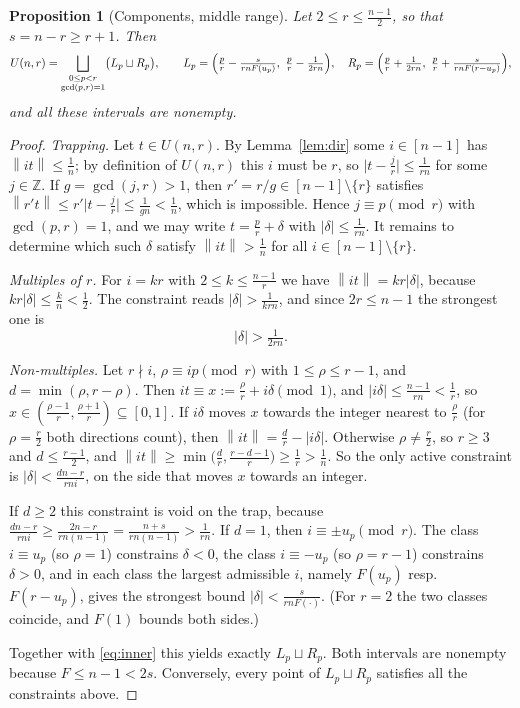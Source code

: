 \documentclass[11pt]{article}
\newtheorem{proposition}[theorem]{Proposition}
\theoremstyle{definition}
\newcommand{\Z}{\mathbb{Z}}
\newcommand{\norm}[1]{\left\lVert #1 \right\rVert}
\begin{document}
\begin{proposition}[Components, middle range]\label{prop:comp}
Let $2\le r\le\frac{n-1}2$, so that $s=n-r\ge r+1$. Then
\[
U(n,r)=\bigsqcup_{\substack{0\le p<r\\ \gcd(p,r)=1}}\bigl(L_p\sqcup R_p\bigr),
\qquad
L_p=\Bigl(\tfrac pr-\tfrac{s}{rnF(u_p)},\ \tfrac pr-\tfrac1{2rn}\Bigr),\quad
R_p=\Bigl(\tfrac pr+\tfrac1{2rn},\ \tfrac pr+\tfrac{s}{rnF(r-u_p)}\Bigr),
\]
and all these intervals are nonempty.
\end{proposition}

\begin{proof}
\emph{Trapping.} Let $t\in U(n,r)$. By Lemma~\ref{lem:dir} some
$i\in[n-1]$ has $\norm{it}\le\frac1n$; by definition of $U(n,r)$ this
$i$ must be $r$, so $\lvert t-\frac jr\rvert\le\frac1{rn}$ for some
$j\in\Z$. If $g=\gcd(j,r)>1$, then $r'=r/g\in[n-1]\setminus\{r\}$
satisfies
$\norm{r't}\le r'\lvert t-\frac jr\rvert\le\frac1{gn}<\frac1n$, which is
impossible. Hence $j\equiv p\pmod r$ with $\gcd(p,r)=1$, and we may
write $t=\frac pr+\delta$ with $\lvert\delta\rvert\le\frac1{rn}$. It
remains to determine which such $\delta$ satisfy $\norm{it}>\frac1n$
for all $i\in[n-1]\setminus\{r\}$.

\emph{Multiples of $r$.} For $i=kr$ with $2\le k\le\frac{n-1}r$ we
have $\norm{it}=kr\lvert\delta\rvert$, because
$kr\lvert\delta\rvert\le\frac kn<\frac12$. The constraint reads
$\lvert\delta\rvert>\frac1{krn}$, and since $2r\le n-1$ the strongest
one is
\begin{equation}\label{eq:inner}
\lvert\delta\rvert>\tfrac1{2rn}.
\end{equation}

\emph{Non-multiples.} Let $r\nmid i$, $\rho\equiv ip\pmod r$ with
$1\le\rho\le r-1$, and $d=\min(\rho,r-\rho)$. Then
$it\equiv x:=\frac\rho r+i\delta\pmod1$, and
$\lvert i\delta\rvert\le\frac{n-1}{rn}<\frac1r$, so
$x\in(\frac{\rho-1}r,\frac{\rho+1}r)\subseteq[0,1]$. If $i\delta$ moves
$x$ towards the integer nearest to $\frac\rho r$ (for $\rho=\frac r2$
both directions count), then $\norm{it}=\frac dr-\lvert i\delta\rvert$.
Otherwise $\rho\ne\frac r2$, so $r\ge3$ and $d\le\frac{r-1}2$, and
$\norm{it}\ge\min\bigl(\frac dr,\frac{r-d-1}r\bigr)\ge\frac1r>\frac1n$.
So the only active constraint is
$\lvert\delta\rvert<\frac{dn-r}{rni}$, on the side that moves $x$
towards an integer.

If $d\ge2$ this constraint is void on the trap, because
$\frac{dn-r}{rni}\ge\frac{2n-r}{rn(n-1)}=\frac{n+s}{rn(n-1)}>\frac1{rn}$.
If $d=1$, then $i\equiv\pm u_p\pmod r$. The class $i\equiv u_p$ (so
$\rho=1$) constrains $\delta<0$, the class $i\equiv-u_p$ (so
$\rho=r-1$) constrains $\delta>0$, and in each class the largest
admissible $i$, namely $F(u_p)$ resp.\ $F(r-u_p)$, gives the strongest
bound $\lvert\delta\rvert<\frac{s}{rnF(\cdot)}$. (For $r=2$ the two
classes coincide, and $F(1)$ bounds both sides.)

Together with \eqref{eq:inner} this yields exactly $L_p\sqcup R_p$.
Both intervals are nonempty because $F\le n-1<2s$. Conversely, every
point of $L_p\sqcup R_p$ satisfies all the constraints above.
\end{proof}
\end{document}
